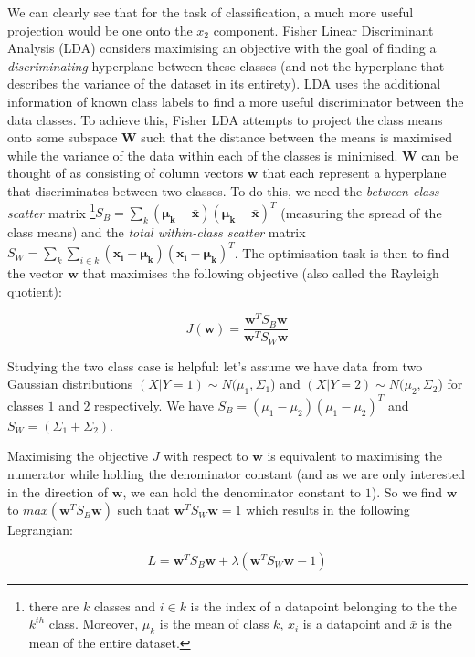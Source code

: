 \documentclass{article}
\begin{document}
We can clearly see that for the task of classification, a much more useful projection would be one onto the $x_2$ component. Fisher Linear Discriminant Analysis (LDA) considers maximising an objective with the goal of finding a \textit{discriminating} hyperplane between these classes \cite{welling2005fisher} (and not the hyperplane that describes the variance of the dataset in its entirety). LDA uses the additional information of known class labels to find a more useful discriminator between the data classes. To achieve this, Fisher LDA attempts to project the class means onto some subspace $\mathbf{W}$ such that the distance between the means is maximised while the variance of the data within each of the classes is minimised. $\mathbf{W}$ can be thought of as consisting of column vectors $\mathbf{w}$ that each represent a hyperplane that discriminates between two classes. To do this, we need the \textit{between-class scatter} matrix \footnote{there are $k$ classes and $i \in k$ is the index of a datapoint belonging to the the $k^{th}$ class. Moreover, $\mu_k$ is the mean of class $k$, $x_i$ is a datapoint and $\bar{x}$ is the mean of the entire dataset.}$S_B = \sum_k(\mathbf{\mu_k - \mathbf{\bar{x}}})(\mathbf{\mu_k - \mathbf{\bar{x}}})^T$ (measuring the spread of the class means) and the \textit{total within-class scatter} matrix $S_W = \sum_k \sum_{i \in k}(\mathbf{x_i} - \mathbf{\mu_k})(\mathbf{x_i} - \mathbf{\mu_k})^T$. The optimisation task is then to find the vector $\mathbf{w}$ that maximises the following objective (also called the Rayleigh quotient):

$$
J(\mathbf{w}) = \frac{\mathbf{w}^TS_B\mathbf{w}}{\mathbf{w}^TS_W\mathbf{w}}
$$

Studying the two class case is helpful: let's assume we have data from two Gaussian distributions $(X|Y=1) \sim N(\mu_1, \Sigma_1$) and $(X|Y=2) \sim N(\mu_2, \Sigma_2$) for classes $1$ and $2$ respectively. We have $S_B = (\mu_1 - \mu_2)(\mu_1 - \mu_2)^T$ and $S_W = (\Sigma_1 + \Sigma_2)$.

Maximising the objective $J$ with respect to $\mathbf{w}$ is equivalent to maximising the numerator while holding the denominator constant (and as we are only interested in the direction of $\mathbf{w}$, we can hold the denominator constant to $1$). So we find $\mathbf{w}$ to $max (\mathbf{w}^TS_B\mathbf{w})$ such that $\mathbf{w}^TS_W\mathbf{w} = 1$ which results in the following Legrangian:

$$
L = \mathbf{w}^T S_B\mathbf{w} + \lambda(\mathbf{w}^T S_W\mathbf{w} - 1)
$$
\end{document}
